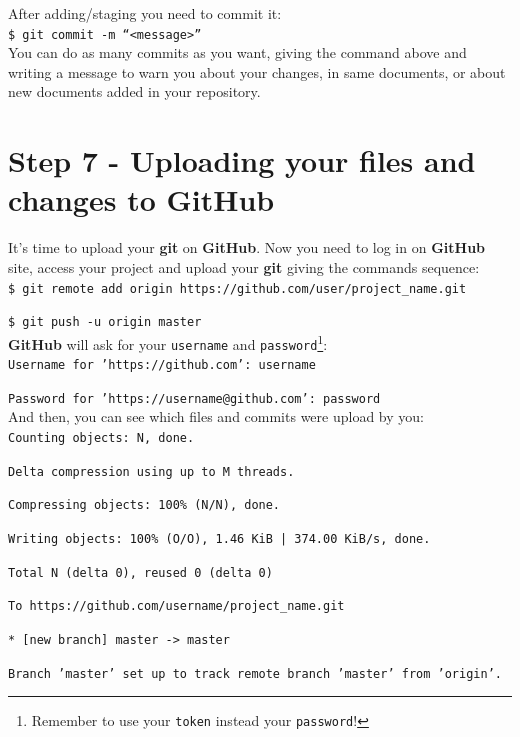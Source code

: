 \documentclass[12pt,a4paper,titlepage,brazil]{article}
\begin{document}
{After adding/staging you need to commit it:\\

\texttt{\$ git commit -m ``<message>''}\\

You can do as many commits as you want, giving the command above and writing a message to warn you about your changes, in same documents, or about new documents added in your repository.


\section{Step 7 - Uploading your files and changes to GitHub}

It's time to upload your {\bf git} on {\bf GitHub}. Now you need to log in on {\bf GitHub} site, access your project and upload your {\bf git} giving the commands sequence:\\

\texttt{\$ git remote add origin https://github.com/user/project\_name.git}

\texttt{\$ git push -u origin master}\\

{\bf GitHub} will ask for your \texttt{username} and  \texttt{password}\footnote{Remember to use your \texttt{token} instead your \texttt{password}!}:\\

\texttt{Username for 'https://github.com': username}

\texttt{Password for 'https://username@github.com': password}\\

And then, you can see which files and commits were upload by you:\\

\texttt{Counting objects: N, done.}
  
\texttt{Delta compression using up to M threads.}

\texttt{Compressing objects: 100\% (N/N), done.}

\texttt{Writing objects: 100\% (O/O), 1.46 KiB | 374.00 KiB/s, done.}

\texttt{Total N (delta 0), reused 0 (delta 0)}

\texttt{To https://github.com/username/project\_name.git}

\texttt{* [new branch]      master -> master}

\texttt{Branch 'master' set up to track remote branch 'master' from 'origin'.}\\

}
\end{document}
